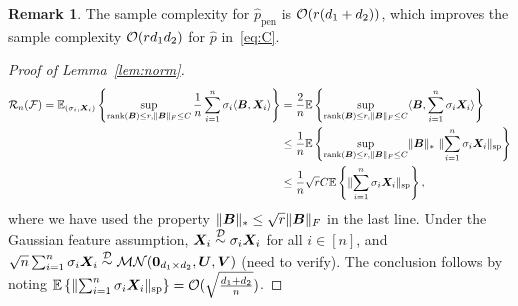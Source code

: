 \documentclass[11pt]{article}
\theoremstyle{plain}
\theoremstyle{definition}
\newtheorem{rmk}{Remark}
\begin{document}
\begin{rmk}
The sample complexity for $\hat p_{\text{pen}}$ is $\mathcal{O}(r(d_1+d_2))$, which improves the sample complexity $\mathcal{O}(rd_1d_2)$ for $\hat p$ in~\eqref{eq:C}.
\end{rmk}

\begin{proof}[Proof of Lemma~\ref{lem:norm}]
\begin{align}\label{eq:result}
\mathcal{R}_n(\mathcal{F})=\mathbb{E}_{(\sigma_i, \bm X_i)}\left\{\sup_{ \text{rank}(\bm B)\leq r, \lVert\bm B\rVert_F\leq C}{1\over n}\sum_{i=1}^n \sigma_i \langle \bm B, \bm X_i\rangle\right\}&={2\over n} \mathbb{E}\left\{\sup_{\text{rank}(\bm B)\leq r, \lVert\bm B\rVert_F\leq C}\langle \bm B, \sum_{i=1}^n \sigma_i \bm X_i\rangle\right\}\\
&\leq {1\over n}\mathbb{E}\left\{\sup_{\text{rank}(\bm B)\leq r, \lVert\bm B\rVert_F\leq C} \lVert\bm B\rVert_*\ \lVert\sum_{i=1}^n \sigma_i \bm X_i \rVert_\text{sp}\right\}\\
&\leq {1\over n}\sqrt{r}C\mathbb{E}\left\{\lVert\sum_{i=1}^n\sigma_i \bm X_i\rVert_\text{sp}\right\},
\end{align}
where we have used the property $\lVert\bm B\rVert_*\leq\sqrt{r}\lVert\bm B\rVert_F$ in the last line. 
Under the Gaussian feature assumption, $\bm X_i\stackrel{\mathcal{D}}\sim \sigma_i \bm X_i$ for all $i\in[n]$, and $\sqrt{n} \sum_{i=1}^n \sigma_i \bm X_i \stackrel{\mathcal{D}}{\sim} \mathcal{M}\mathcal{N}({\bf 0}_{d_1\times d_2}, \bm{U}, \bm{V})$ (need to verify). The conclusion follows by noting $\mathbb{E}\left\{\lVert\sum_{i=1}^n\sigma_i \bm X_i\rVert_\text{sp}\right\}=\mathcal{O}(\sqrt{d_1+d_2\over n})$.
\end{proof}
\end{document}
